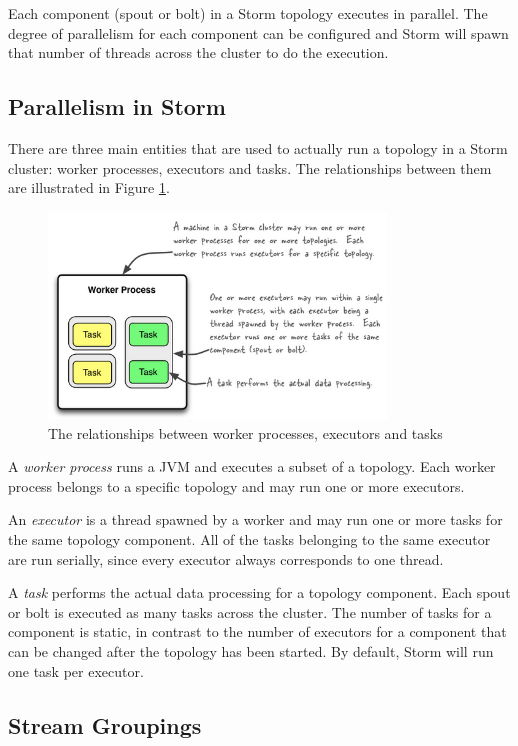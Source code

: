 Each component (spout or bolt) in a Storm topology executes in parallel. The degree of parallelism for each component can be configured and Storm will spawn that number of threads across the cluster to do the execution.

\subsection{Parallelism in Storm}

There are three main entities that are used to actually run a topology in a Storm cluster: worker processes, executors and tasks. The relationships between them are illustrated in Figure \ref{figure:storm_parallelism}.

\begin{figure}[H]
\centering
\includegraphics[width=0.8\textwidth]{figures/storm_parallelism}
\caption{The relationships between worker processes, executors and tasks}
\label{figure:storm_parallelism}
\end{figure}

A \emph{worker process} runs a JVM and executes a subset of a topology. Each worker process belongs to a specific topology and may run one or more executors.

An \emph{executor} is a thread spawned by a worker and may run one or more tasks for the same topology component. All of the tasks belonging to the same executor are run serially, since every executor always corresponds to one thread.

A \emph{task} performs the actual data processing for a topology component. Each spout or bolt is executed as many tasks across the cluster. The number of tasks for a component is static, in contrast to the number of executors for a component that can be changed after the topology has been started. By default, Storm will run one task per executor.

\subsection{Stream Groupings}

